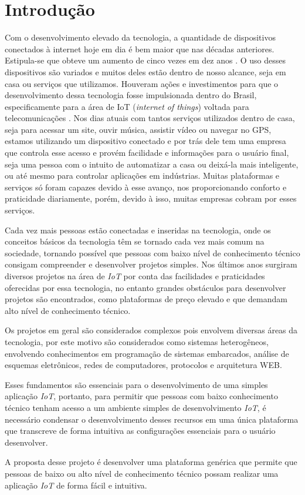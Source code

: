 \documentclass[../../layout.tex]{subfiles}
\begin{document}
\chapter{Introdução}
\hspace*{3em}Com o desenvolvimento elevado da tecnologia, a quantidade de dispositivos conectados à internet hoje em dia é bem maior que nas décadas anteriores. Estipula-se que obteve um aumento de cinco vezes em dez anos . O uso desses dispositivos são variados e muitos deles estão dentro de nosso alcance, seja em casa ou serviços que utilizamos. Houveram ações e investimentos para que o desenvolvimento dessa tecnologia fosse impulsionada dentro do Brasil, especificamente para a área de IoT (\emph{internet of things}) voltada para telecomunicações . Nos dias atuais com tantos serviços utilizados dentro de casa, seja para acessar um site, ouvir música, assistir vídeo ou navegar no GPS, estamos utilizando um dispositivo conectado e por trás dele tem uma empresa que controla esse acesso e provém facilidade e informações para o usuário final, seja uma pessoa com o intuito de automatizar a casa ou deixá-la mais inteligente, ou até mesmo para controlar aplicações em indústrias. Muitas plataformas e serviços só foram capazes devido à esse avanço, nos proporcionando conforto e praticidade diariamente, porém, devido à isso, muitas empresas cobram por esses serviços.\par
Cada vez mais pessoas estão conectadas e inseridas na tecnologia, onde os conceitos básicos da tecnologia têm se tornado cada vez mais comum na sociedade, tornando possível  que pessoas com baixo nível de conhecimento técnico consigam compreender e desenvolver projetos simples. Nos últimos anos surgiram diversos projetos na área de \emph{IoT} por conta das facilidades e praticidades oferecidas por essa tecnologia, no entanto grandes obstáculos para desenvolver projetos são encontrados, como plataformas de preço elevado e que demandam alto nível de conhecimento técnico.\par
Os projetos em geral são considerados complexos pois envolvem diversas áreas da tecnologia, por este motivo são considerados como sistemas heterogêneos, envolvendo conhecimentos em programação de sistemas embarcados, análise de esquemas eletrônicos, redes de computadores, protocolos e arquitetura WEB.\par
Esses fundamentos são essenciais para o desenvolvimento de uma simples aplicação \emph{IoT}, portanto, para permitir que pessoas com baixo conhecimento técnico tenham acesso a um ambiente simples de desenvolvimento \emph{IoT}, é necessário condensar o desenvolvimento desses recursos em uma única plataforma que transcreve de forma intuitiva as configurações essenciais para o usuário desenvolver.\cite{IoTeveryone} \par
A proposta desse projeto é desenvolver uma plataforma genérica que permite que pessoas de baixo ou alto nível de conhecimento técnico possam realizar uma aplicação \emph{IoT} de forma fácil e intuitiva.
\end{document}
